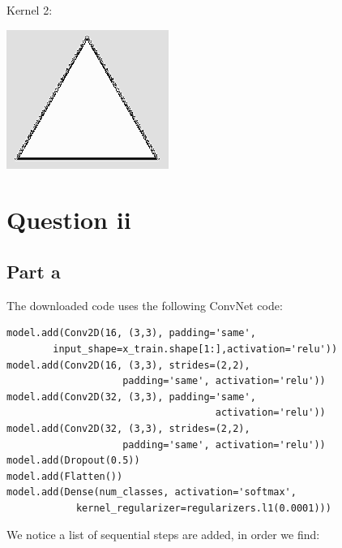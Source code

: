\documentclass[10pt]{article}
\begin{document}
\vspace{5mm} %
Kernel 2:
\begin{center}
    \includegraphics[scale=0.3]{ml_triangle_2.PNG}
\end{center}

\section{Question ii}
\subsection*{Part a}
The downloaded code uses the following ConvNet code:
\begin{lstlisting}
model.add(Conv2D(16, (3,3), padding='same',
        input_shape=x_train.shape[1:],activation='relu'))
model.add(Conv2D(16, (3,3), strides=(2,2), 
                    padding='same', activation='relu'))
model.add(Conv2D(32, (3,3), padding='same', 
                                    activation='relu'))
model.add(Conv2D(32, (3,3), strides=(2,2),
                    padding='same', activation='relu'))
model.add(Dropout(0.5))
model.add(Flatten())
model.add(Dense(num_classes, activation='softmax',
            kernel_regularizer=regularizers.l1(0.0001)))
\end{lstlisting}

We notice a list of sequential steps are added, in order we find:
\end{document}
